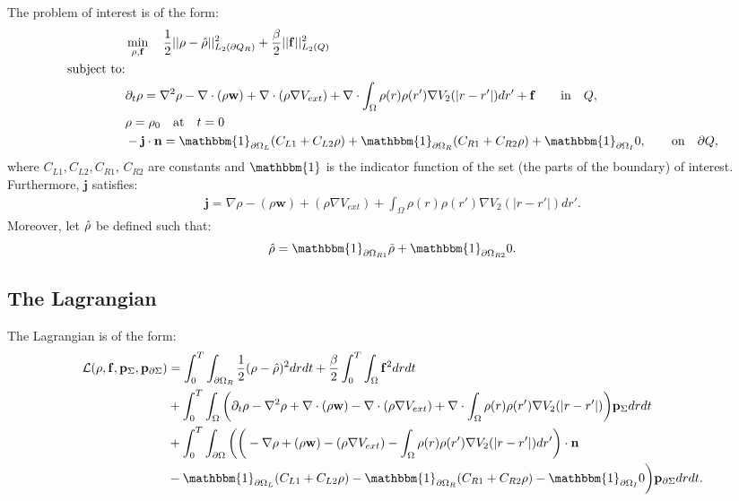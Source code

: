 

The problem of interest is of the form:
\begin{align*}
&\min_{\Sta, \Con} \quad \frac{1}{2}|| \Sta -\hat \Sta||^2_{L_2(\partial Q_R)} + \frac{\beta}{2}|| \Con||^2_{L_2(Q)}\\
\text{subject to:}\\
&\partial_t \rho = \nabla^2 \rho - \nabla \cdot (\rho \mathbf{w}) +\nabla \cdot (\rho \nabla V_{ext}) + \nabla \cdot \int_\Omega \rho(r) \rho(r') \nabla V_2(|r-r'|) dr' + \Con \quad  \quad\text{in} \quad Q,\notag\\
& \rho = \rho_0 \quad \text{at} \quad t=0 \notag\\
& - \mathbf{j} \cdot \nor = \mathbbm{1}_{\partial \Omega_L}( C_{L1}  + C_{L2}\Sta) +\mathbbm{1}_{\partial \Omega_R} ( C_{R1}  + C_{R2}\Sta) +\mathbbm{1}_{\partial \Omega_I} 0, \quad  \quad\text{on} \quad \partial Q, 
\end{align*}
where $C_{L1}, C_{L2}, C_{R1}$, $C_{R2}$ are constants and $\mathbbm{1}$ is the indicator function of the set (the parts of the boundary) of interest.
Furthermore, $\mathbf{j}$ satisfies:
\begin{align*}
\mathbf{j}=\nabla \rho - (\rho \mathbf{w}) +(\rho \nabla V_{ext}) +  \int_\Omega \rho(r) \rho(r') \nabla V_2(|r-r'|) dr'.
\end{align*}
Moreover, let $\hat {\rho}$ be defined such that:
\begin{align*}
\hat \Sta = \mathbbm{1}_{\partial \Omega_{R1}} \tilde \Sta  +\mathbbm{1}_{\partial \Omega_{R2}} 0.
\end{align*}

\subsection*{The Lagrangian}
The Lagrangian is of the form:
\begin{align*}
\mathcal{L}(\Sta,\Con,\Adja,\Adjc ) &= \int_0^T \int_{\partial \Omega_R} \frac{1}{2}(\Sta - \hat \Sta)^2 dr dt + \frac{\beta}{2}\int_0^T \int_\Omega \Con^2 drdt \\
&+ \int_0^T \int_\Omega \bigg( \partial_t \rho - \nabla^2 \rho + \nabla \cdot (\rho \mathbf{w}) -\nabla \cdot (\rho \nabla V_{ext}) + \nabla \cdot \int_\Omega \rho(r) \rho(r') \nabla V_2(|r-r'|) \bigg) \Adja dr dt\\
&+ \int_0^T \int_{\partial \Omega} \bigg(  \bigg(-\nabla \rho+ (\rho \mathbf{w}) -(\rho \nabla V_{ext}) -  \int_\Omega \rho(r) \rho(r') \nabla V_2(|r-r'|) dr' \bigg)\cdot \nor\\
&  -\mathbbm{1}_{\partial \Omega_L}( C_{L1}  + C_{L2}\Sta) -\mathbbm{1}_{\partial \Omega_R} ( C_{R1}  + C_{R2}\Sta) -\mathbbm{1}_{\partial \Omega_I} 0 \bigg) \Adjc dr dt.
\end{align*}

